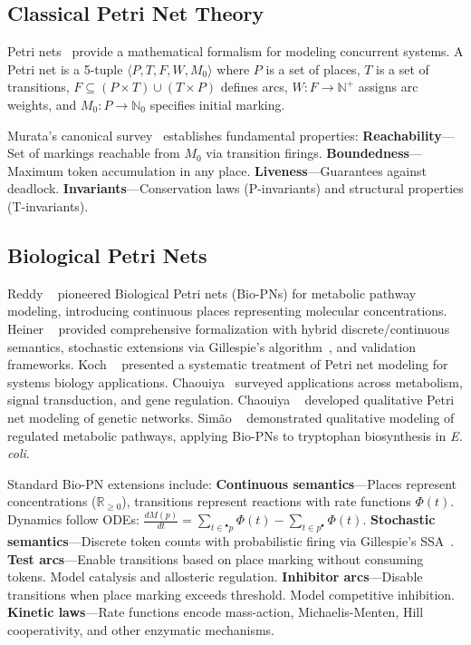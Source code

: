 
\subsection{Classical Petri Net Theory}

Petri nets~\cite{petri1962} provide a mathematical formalism for modeling concurrent systems. A Petri net is a 5-tuple $\langle P, T, F, W, M_0 \rangle$ where $P$ is a set of places, $T$ is a set of transitions, $F \subseteq (P \times T) \cup (T \times P)$ defines arcs, $W: F \to \mathbb{N}^+$ assigns arc weights, and $M_0: P \to \mathbb{N}_0$ specifies initial marking.

Murata's canonical survey~\cite{murata1989} establishes fundamental properties: \textbf{Reachability}---Set of markings reachable from $M_0$ via transition firings. \textbf{Boundedness}---Maximum token accumulation in any place. \textbf{Liveness}---Guarantees against deadlock. \textbf{Invariants}---Conservation laws (P-invariants) and structural properties (T-invariants).

\subsection{Biological Petri Nets}

Reddy \etal~\cite{reddy1993} pioneered Biological Petri nets (Bio-PNs) for metabolic pathway modeling, introducing continuous places representing molecular concentrations. Heiner \etal~\cite{heiner2008} provided comprehensive formalization with hybrid discrete/continuous semantics, stochastic extensions via Gillespie's algorithm~\cite{gillespie1977}, and validation frameworks. Koch \etal~\cite{koch2011} presented a systematic treatment of Petri net modeling for systems biology applications. Chaouiya~\cite{chaouiya2007} surveyed applications across metabolism, signal transduction, and gene regulation. Chaouiya \etal~\cite{chaouiya2006} developed qualitative Petri net modeling of genetic networks. Sim\~ao \etal~\cite{simao2005} demonstrated qualitative modeling of regulated metabolic pathways, applying Bio-PNs to tryptophan biosynthesis in \textit{E. coli}.

Standard Bio-PN extensions include: \textbf{Continuous semantics}---Places represent concentrations ($\mathbb{R}_{\geq 0}$), transitions represent reactions with rate functions $\Phi(t)$. Dynamics follow ODEs: $\frac{dM(p)}{dt} = \sum_{t \in {}^\bullet p} \Phi(t) - \sum_{t \in p^\bullet} \Phi(t)$. \textbf{Stochastic semantics}---Discrete token counts with probabilistic firing via Gillespie's SSA~\cite{gillespie1977}. \textbf{Test arcs}---Enable transitions based on place marking without consuming tokens. Model catalysis and allosteric regulation. \textbf{Inhibitor arcs}---Disable transitions when place marking exceeds threshold. Model competitive inhibition. \textbf{Kinetic laws}---Rate functions encode mass-action, Michaelis-Menten, Hill cooperativity, and other enzymatic mechanisms.

